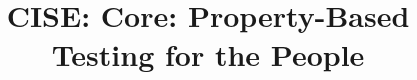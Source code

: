 \documentclass{NSF}
\newcommand{\todo}[1]{\ifdraft {\color{nord-red} TODO: #1} \fi}
\begin{document}
\fontsize{10.1pt}{12.1}\selectfont

\vspace*{2in}
\title{CISE: Core: Property-Based Testing for the People}


\newpage





\newpage{}


\newpage{}
\renewcommand\refname{References Cited}

% 
% 


\newpage{}


\newpage{}


% 

% 

\newpage{}


\newpage{}

\end{document}
